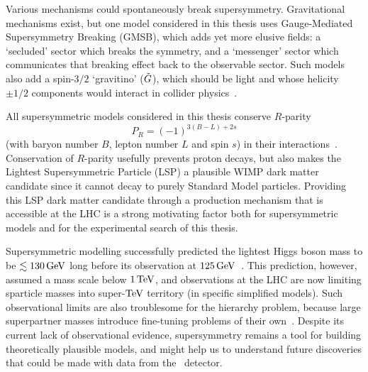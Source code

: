 Various mechanisms could spontaneously break supersymmetry.
Gravitational mechanisms exist, but one model considered in this thesis uses
Gauge-Mediated Supersymmetry Breaking (GMSB),
which adds yet more elusive fields:
a `secluded' sector which breaks the symmetry, and
a `messenger' sector which
communicates that breaking effect back to the observable sector.
Such models also add a spin-$3/2$ `gravitino' ($\gravitino$),
which should be light and whose helicity $\pm1/2$ components would interact
in collider physics~\cite{
giudice1999gmsb,
dine1982pheno,
martin2016primer
}.

All supersymmetric models considered in this thesis conserve $R$-parity
\begin{equation}
P_R = (-1)^{3(B - L) + 2s}
\end{equation}
(with baryon number $B$, lepton number $L$ and spin $s$)
in their interactions~\cite{
farrar1978rparity,
martin2016primer
}.
Conservation of $R$-parity usefully prevents proton decays,
but also makes the Lightest Supersymmetric Particle (LSP) a plausible
WIMP dark matter candidate since it cannot decay to purely Standard Model
particles.
Providing this LSP dark matter candidate through a production mechanism
that is accessible at the LHC is a strong motivating factor both for
supersymmetric models and for the experimental search of this thesis.

Supersymmetric modelling successfully predicted the lightest Higgs boson
mass to be $\lesssim 130\,\eV[G]$ long before its observation at
$125\,\eV[G]$~\cite{
espinosa1992higgs,
espinosa1993upper,
quiros1997constraints,
wells2020discovery,
atlas2012higgs,
atlas2012combined,
cms2012higgs
}.
This prediction, however, assumed a mass scale below $1\,\eV[T]$,
and observations at the LHC are now limiting sparticle masses into
super-$\eV[T]$ territory (in specific simplified models).
Such observational limits are also troublesome for the hierarchy problem,
because large superpartner masses introduce fine-tuning problems of their
own~\cite{martin2016primer}.
Despite its current lack of observational evidence,
supersymmetry remains a tool for building theoretically plausible
models, and might help us to understand future discoveries
that could be made with data from the \atlas\ detector.

